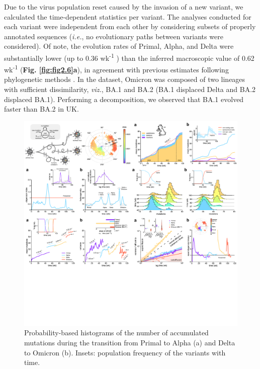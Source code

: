 Due to the virus population reset caused by the invasion of a new variant, we calculated the time-dependent statistics per variant. The analyses conducted for each variant were independent from each other by considering subsets of properly annotated sequences (\textit{i.e.}, no evolutionary paths between variants were considered). Of note, the evolution rates of Primal, Alpha, and Delta were substantially lower (up to 0.36 wk\textsuperscript{-1} ) than the inferred macroscopic value of 0.62 wk\textsuperscript{-1} (\textbf{Fig. \ref{fig:fig2.6}a}), in agreement with previous estimates following phylogenetic methods \cite{ghafari2022}. In the dataset, Omicron was composed of two lineages with sufficient dissimilarity, \textit{viz.}, BA.1 and BA.2 (BA.1 displaced Delta and BA.2 displaced BA.1). Performing a decomposition, we observed that BA.1 evolved faster than BA.2 in UK.\\

\begin{figure}[ht!]
    \centering
    \includegraphics[trim={25.3cm 26cm 0.3cm 11cm},clip, width=\linewidth]{assets/Ch2Fig.pdf}
    \caption{Probability-based histograms of the number of accumulated mutations during the transition from Primal to Alpha (a) and Delta to Omicron (b). Insets: population frequency of the variants with time.}\label{fig:fig2.5}
\end{figure}

